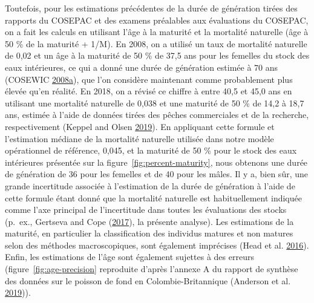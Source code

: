 \documentclass[11pt]{book}
\begin{document}
Toutefois, pour les estimations précédentes de la durée de génération tirées des rapports du COSEPAC et des examens préalables aux évaluations du COSEPAC, on a fait les calculs en utilisant l'âge à la maturité et la mortalité naturelle (âge à 50 \% de la maturité + 1/M). En 2008, on a utilisé un taux de mortalité naturelle de 0,02 et un âge à la maturité de 50 \% de 37,5 ans pour les femelles du stock des eaux intérieures, ce qui a donné une durée de génération estimée à 70 ans (COSEWIC \protect\hyperlink{ref-cosewic2008}{2008}\protect\hyperlink{ref-cosewic2008}{a}), que l'on considère maintenant comme probablement plus élevée qu'en réalité. En 2018, on a révisé ce chiffre à entre 40,5 et 45,0 ans en utilisant une mortalité naturelle de 0,038 et une maturité de 50 \% de 14,2 à 18,7 ans, estimée à l'aide de données tirées des pêches commerciales et de la recherche, respectivement (Keppel and Olsen \protect\hyperlink{ref-keppel2019}{2019}). En appliquant cette formule et l'estimation médiane de la mortalité naturelle utilisée dans notre modèle opérationnel de référence, 0,045, et la maturité de 50 \% pour le stock des eaux intérieures présentée sur la figure~\ref{fig:percent-maturity}, nous obtenons une durée de génération de 36 pour les femelles et de 40 pour les mâles. Il y a, bien sûr, une grande incertitude associée à l'estimation de la durée de génération à l'aide de cette formule étant donné que la mortalité naturelle est habituellement indiquée comme l'axe principal de l'incertitude dans toutes les évaluations des stocks (p.~ex., Gertseva and Cope (\protect\hyperlink{ref-gertseva2017}{2017}), la présente analyse). Les estimations de la maturité, en particulier la classification des individus matures et non matures selon des méthodes macroscopiques, sont également imprécises (Head et al. \protect\hyperlink{ref-head2016}{2016}). Enfin, les estimations de l'âge sont également sujettes à des erreurs (figure~\ref{fig:age-precision} reproduite d'après l'annexe A du rapport de synthèse des données sur le poisson de fond en Colombie-Britannique (Anderson et al. \protect\hyperlink{ref-anderson2019synopsis}{2019})).

\clearpage
\end{document}

